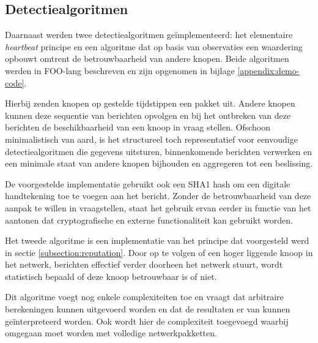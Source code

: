 \subsection{Detectiealgoritmen}
\label{subsection:eval-algorithms}

Daarnaast werden twee detectiealgoritmen ge\"implementeerd: het elementaire
\emph{heartbeat} principe en een algoritme dat op basis van observaties een
waardering opbouwt omtrent de betrouwbaarheid van andere knopen. Beide
algoritmen werden in FOO-lang beschreven en zijn opgenomen in bijlage
\ref{appendix:demo-code}.

\begin{description}[noitemsep, topsep=0pt, partopsep=1pt]

  \item[\emph{Heartbeat}] Hierbij zenden knopen op gestelde tijdstippen een
  pakket uit. Andere knopen kunnen deze sequentie van berichten opvolgen en bij
  het ontbreken van deze berichten de beschikbaarheid van een knoop in vraag
  stellen. Ofschoon minimalistisch van aard, is het structureel toch
  representatief voor eenvoudige detectiealgoritmen die gegevens uitsturen,
  binnenkomende berichten verwerken en een minimale staat van andere knopen
  bijhouden en aggregeren tot een beslissing.

  De voorgestelde implementatie gebruikt ook een SHA1 hash \citep{rfc:3174} om
  een digitale handtekening toe te voegen aan het bericht. Zonder de
  betrouwbaarheid van deze aanpak te willen in vraagstellen, staat het gebruik
  ervan eerder in functie van het aantonen dat cryptografische en externe
  functionaliteit kan gebruikt worden.

  \item[Reputatie] Het tweede algoritme is een implementatie van het principe
  dat voorgesteld werd in sectie \ref{subsection:reputation}. Door op te volgen
  of een hoger liggende knoop in het netwerk, berichten effectief verder
  doorheen het netwerk stuurt, wordt statistisch bepaald of deze knoop
  betrouwbaar is of niet.

  Dit algoritme voegt nog enkele complexiteiten toe en vraagt dat arbitraire
  berekeningen kunnen uitgevoerd worden en dat de resultaten er van kunnen
  ge\"interpreteerd worden. Ook wordt hier de complexiteit toegevoegd waarbij
  omgegaan moet worden met volledige netwerkpakketten.

\end{description}

\vspace{-3mm}

